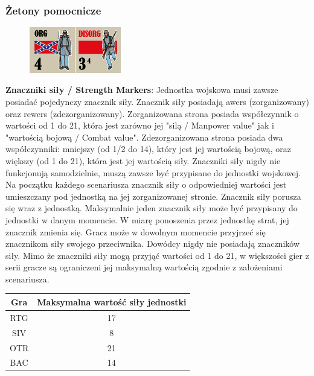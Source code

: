 \documentclass[10pt,twoside,a4paper,table]{article}
\begin{document}
\begin{multicols*}{2}
	\subsubsection*{Żetony pomocnicze}
	\begin{figure}
		\includegraphics[width=4cm, height=2cm]{strength.png} 
	\end{figure}
	\textbf{Znaczniki siły / Strength Markers}: Jednostka wojskowa musi zawsze posiadać pojedynczy znacznik siły. Znacznik siły posiadają awers (zorganizowany) oraz rewers (zdezorganizowany). Zorganizowana strona posiada współczynnik o wartości od 1 do 21, która jest zarówno jej "silą / Manpower value" jak i "wartością bojową	/ Combat value". Zdezorganizowana strona posiada dwa współczynniki: mniejszy (od 1/2 do 14), który jest jej wartością bojową, oraz większy (od 1 do 21), która jest jej wartością siły. Znaczniki siły nigdy nie funkcjonują samodzielnie, muszą zawsze być przypisane do jednostki wojskowej. Na początku  każdego scenariusza znacznik siły o odpowiedniej wartości jest umieszczany pod jednostką na jej zorganizowanej stronie. Znacznik siły porusza się wraz z jednostką. Maksymalnie jeden znacznik siły może być przypisany do jednostki w danym momencie. W miarę ponoszenia przez jednostkę strat, jej znacznik zmienia się. Gracz może w dowolnym momencie przyjrzeć się znacznikom siły swojego przeciwnika. Dowódcy nigdy nie posiadają znaczników siły.
	Mimo że znaczniki siły mogą przyjąć wartości od 1 do 21, w większości gier z serii gracze są ograniczeni jej maksymalną wartością zgodnie z założeniami scenariusza.\par
	\begin{center}
		\begin{tabular}{ |c|c| } 
			\hline
			\rowcolor{gray!80}\textbf{Gra} & \textbf{Maksymalna wartość siły jednostki} \\ 
			\hline
			RTG                            & 17                                            \\ 
			\hline
			SIV                            & 8                                             \\ 
			\hline
			OTR                            & 21                                            \\
			\hline
			BAC                            & 14                                            \\

\end{tabular}
\end{center}
\end{multicols*}
\end{document}
